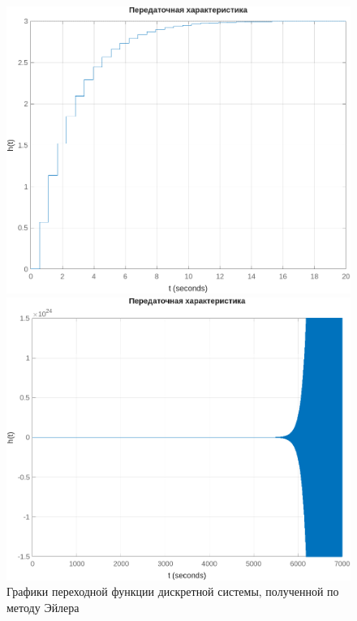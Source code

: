 \documentclass[a4paper]{article}
\begin{document}
\begin{figure}[H]
    \centering
    \begin{minipage}{0.356\textwidth}
        \includegraphics[width=1\textwidth]{sources/discrete_0.5667.png}
        \caption*{$h = 0.5667$}
    \end{minipage}
    \hspace{2em}
    \begin{minipage}{0.356\textwidth}
        \includegraphics[width=1\textwidth]{sources/discrete_0.7667.png}
        \caption*{$h = 0.7667$}
    \end{minipage}
    \caption{Графики переходной функции дискретной системы, полученной по методу Эйлера}
    \label{fig:stepplot_discrete}
\end{figure}
\end{document}
